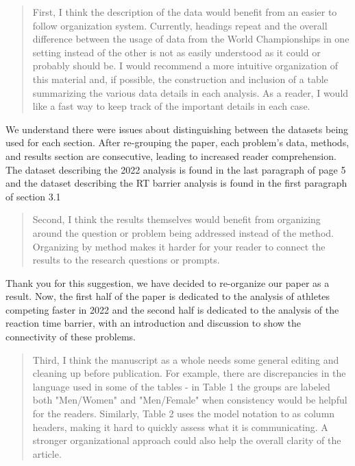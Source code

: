 \documentclass[12pt]{article}
\newenvironment{comment}%
{\begin{quotation}\noindent\small\it\color{darkblue}\ignorespaces%
}{\end{quotation}}
\begin{document}
\begin{comment}
First, I think the description of the data would benefit from an easier to
follow organization system. Currently, headings repeat and the overall
difference between the usage of data from the World Championships in one setting
instead of the other is not as easily understood as it could or probably should
be. I would recommend a more intuitive organization of this material and, if
possible, the construction and inclusion of a table summarizing the various data
details in each analysis. As a reader, I would like a fast way to keep track of
the important details in each case.
\end{comment}

We understand there were issues about distinguishing between the datasets being
used for each section.  After re-grouping the paper, each problem's data, 
methods, and results section are consecutive, leading to increased reader
comprehension.  The dataset describing the 2022 analysis is found in
the last paragraph of page 5 and the dataset describing the RT barrier analysis
is found in the first paragraph of section 3.1


\begin{comment}
Second, I think the results themselves would benefit from organizing around the
question or problem being addressed instead of the method. Organizing by method
makes it harder for your reader to connect the results to the research questions
or prompts.
\end{comment}

Thank you for this suggestion, we have decided to re-organize our paper as a
result. Now, the first half of the paper is dedicated to the analysis of
athletes competing faster in 2022 and the second half is dedicated to the
analysis of the reaction time barrier, with an introduction and discussion to
show the connectivity of these problems.



\begin{comment}
Third, I think the manuscript as a whole needs some general editing and cleaning
up before publication. For example, there are discrepancies in the language used
in some of the tables - in Table 1 the groups are labeled both "Men/Women" and
"Men/Female" when consistency would be helpful for the readers. Similarly, Table
2 uses the model notation to as column headers, making it hard to quickly assess
what it is communicating. A stronger organizational approach could also help the
overall clarity of the article.
\end{comment}
\end{document}
